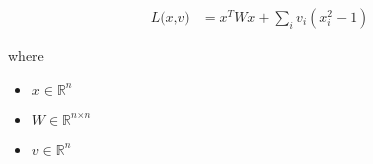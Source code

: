 \documentclass[12pt]{article}
\begin{document}
\begin{align*}
\textit{L(x,v)} & = \textit{x}^T\textit{W}\textit{x} + \sum_\textit{i} \textit{v}_{ \textit{i} }\left( \textit{x}_{ \textit{i} }^{2} - 1 \right)
\end{align*}

where
\begin{itemize}
\item $\textit{x} \in \mathbb{R}^{ \textit{n}}$
\item $\textit{W} \in \mathbb{R}^{ \textit{n} \times \textit{n} }$
\item $\textit{v} \in \mathbb{R}^{ \textit{n}}$
\end{itemize}
\end{document}
